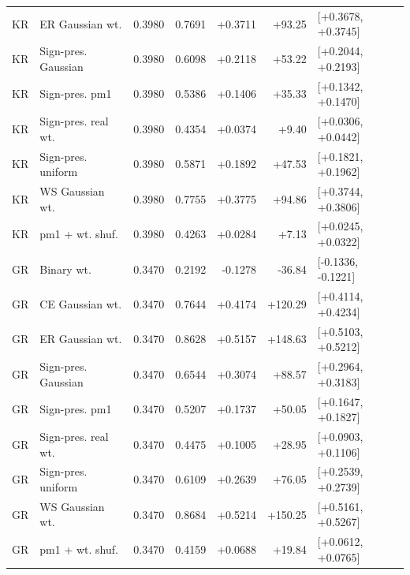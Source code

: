 \begin{tabular}{llrrrrl}
KR & ER Gaussian wt. & 0.3980 & 0.7691 & +0.3711 & +93.25 & [+0.3678, +0.3745] \\
KR & Sign-pres. Gaussian & 0.3980 & 0.6098 & +0.2118 & +53.22 & [+0.2044, +0.2193] \\
KR & Sign-pres. pm1 & 0.3980 & 0.5386 & +0.1406 & +35.33 & [+0.1342, +0.1470] \\
KR & Sign-pres. real wt. & 0.3980 & 0.4354 & +0.0374 & +9.40 & [+0.0306, +0.0442] \\
KR & Sign-pres. uniform & 0.3980 & 0.5871 & +0.1892 & +47.53 & [+0.1821, +0.1962] \\
KR & WS Gaussian wt. & 0.3980 & 0.7755 & +0.3775 & +94.86 & [+0.3744, +0.3806] \\
KR & pm1 + wt. shuf. & 0.3980 & 0.4263 & +0.0284 & +7.13 & [+0.0245, +0.0322] \\
GR & Binary wt. & 0.3470 & 0.2192 & -0.1278 & -36.84 & [-0.1336, -0.1221] \\
GR & CE Gaussian wt. & 0.3470 & 0.7644 & +0.4174 & +120.29 & [+0.4114, +0.4234] \\
GR & ER Gaussian wt. & 0.3470 & 0.8628 & +0.5157 & +148.63 & [+0.5103, +0.5212] \\
GR & Sign-pres. Gaussian & 0.3470 & 0.6544 & +0.3074 & +88.57 & [+0.2964, +0.3183] \\
GR & Sign-pres. pm1 & 0.3470 & 0.5207 & +0.1737 & +50.05 & [+0.1647, +0.1827] \\
GR & Sign-pres. real wt. & 0.3470 & 0.4475 & +0.1005 & +28.95 & [+0.0903, +0.1106] \\
GR & Sign-pres. uniform & 0.3470 & 0.6109 & +0.2639 & +76.05 & [+0.2539, +0.2739] \\
GR & WS Gaussian wt. & 0.3470 & 0.8684 & +0.5214 & +150.25 & [+0.5161, +0.5267] \\
GR & pm1 + wt. shuf. & 0.3470 & 0.4159 & +0.0688 & +19.84 & [+0.0612, +0.0765] \\
\bottomrule
\end{tabular}
